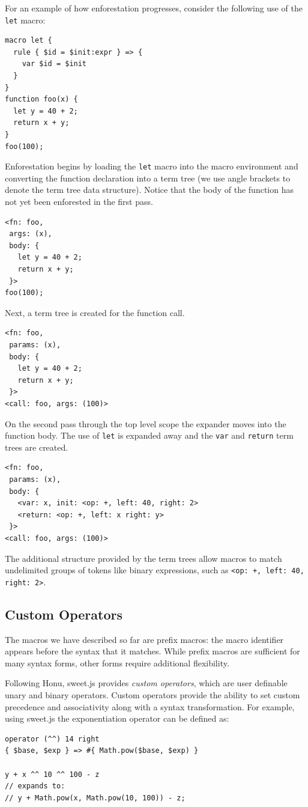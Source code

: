 \documentclass[9pt]{sigplanconf}
\begin{document}
For an example of how enforestation progresses, consider the following
use of the \verb!let! macro:
\begin{lstlisting}
macro let {
  rule { $id = $init:expr } => {
    var $id = $init
  }
}
function foo(x) {
  let y = 40 + 2;
  return x + y;
}
foo(100);
\end{lstlisting}
Enforestation begins by loading the \verb!let! macro into the macro
environment and converting the function declaration into a term tree
(we use angle brackets to denote the term tree data structure). Notice
that the body of the function has not yet been enforested in the first
pass.
\begin{lstlisting}
<fn: foo, 
 args: (x), 
 body: {
   let y = 40 + 2;
   return x + y;
 }>
foo(100);
\end{lstlisting}
Next, a term tree is created for the function call.
\begin{lstlisting}
<fn: foo, 
 params: (x), 
 body: {
   let y = 40 + 2;
   return x + y;
 }>
<call: foo, args: (100)>
\end{lstlisting}
On the second pass through the top level scope the expander moves into
the function body. The use of \verb!let! is expanded away and the
\verb!var! and \verb!return! term trees are created.
\begin{lstlisting}
<fn: foo, 
 params: (x), 
 body: {
   <var: x, init: <op: +, left: 40, right: 2>
   <return: <op: +, left: x right: y> 
 }>
<call: foo, args: (100)>
\end{lstlisting}

The additional structure provided by the term trees allow macros to
match undelimited groups of tokens like binary expressions, such as
\verb!<op: +, left: 40, right: 2>!.

\subsection{Custom Operators}
The macros we have described so far are prefix macros: the macro
identifier appears before the syntax that it matches. While prefix
macros are sufficient for many syntax forms, other forms require
additional flexibility.

Following Honu, sweet.js provides \emph{custom operators}, which are
user definable unary and binary operators. Custom operators provide
the ability to set custom precedence and associativity along with a
syntax transformation. For example, using sweet.js the exponentiation
operator can be defined as:
\begin{lstlisting}
operator (^^) 14 right
{ $base, $exp } => #{ Math.pow($base, $exp) }

y + x ^^ 10 ^^ 100 - z
// expands to:
// y + Math.pow(x, Math.pow(10, 100)) - z;
\end{lstlisting}
\end{document}
